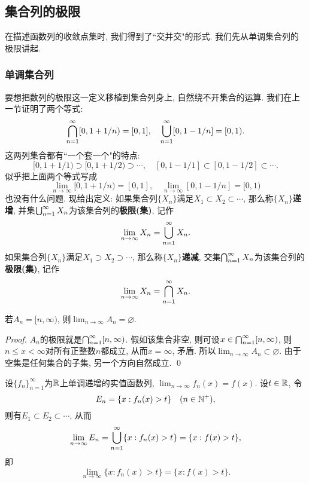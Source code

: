 \subsection{集合列的极限}
在描述函数列的收敛点集时, 我们得到了``交并交"的形式. 
我们先从单调集合列的极限讲起.
\subsubsection*{单调集合列}
要想把数列的极限这一定义移植到集合列身上, 自然绕不开集合的运算. 我们在上一节证明了两个等式: 
$$\bigcap_{n=1}^{\infty}[0, 1+1/n) = [0, 1], \quad 
  \bigcup_{n=1}^{\infty}[0, 1-1/n] = [0, 1). $$
这两列集合都有``一个套一个"的特点:
$$[0, 1+1/1) \supset [0, 1+1/2) \supset \cdots, \quad  
[0, 1-1/1] \subset [0, 1-1/2] \subset \cdots. $$
似乎把上面两个等式写成
$$\lim_{n \to \infty}[0, 1+1/n) = [0, 1], \quad 
  \lim_{n \to \infty}[0, 1-1/n] = [0, 1) $$
也没有什么问题. 现给出定义: 如果集合列$\{X_n\}$满足$X_1 \subset X_2 \subset \cdots$, 那么称$\{X_n\}$\textbf{递增}, 并集$\bigcup_{n=1}^{\infty}X_n$为该集合列的\textbf{极限(集)}, 记作
$$\lim_{n \to \infty}X_n = \bigcup_{n=1}^{\infty}X_n. $$
如果集合列$\{X_n\}$满足$X_1 \supset X_2 \supset \cdots$, 那么称$\{X_n\}$\textbf{递减}, 交集$\bigcap_{n=1}^{\infty}X_n$为该集合列的\textbf{极限(集)}, 记作
$$\lim_{n \to \infty}X_n = \bigcap_{n=1}^{\infty}X_n. $$
\begin{example}
    若$A_n = [n, \infty)$, 则$\lim_{n \to \infty}A_n = \varnothing$.
\end{example}
\begin{proof}
    $A_n$的极限就是$\bigcap_{n=1}^{\infty}[n, \infty)$. 假如该集合非空, 则可设$x \in \bigcap_{n=1}^{\infty}[n, \infty)$, 则$n \leq x < \infty$对所有正整数$n$都成立, 从而$x=\infty$, 矛盾. 所以$\lim_{n \to \infty}A_n \subset \varnothing$. 由于空集是任何集合的子集, 另一个方向自然成立. \qed 
\end{proof}
\begin{example}
    设$\{f_n\}_{n=1}^\infty$为$\mathbb{R}$上单调递增的实值函数列, $\lim_{n \to \infty}f_n(x) = f(x)$. 设$t \in \mathbb{R}$, 令
    $$E_n = \{x : f_n(x) > t\} \quad (n \in \mathbb{N}^+),$$
    则有$E_1 \subset E_2 \subset \cdots$, 从而
    $$\lim_{n \to \infty}E_n = \bigcup_{n=1}^{\infty}\{x: f_n(x) > t\} = \{x : f(x)>t\}, $$
    即$$\lim_{n \to \infty}\{x: f_n(x) > t\} = \{x : f(x)>t\}.$$
\end{example}



